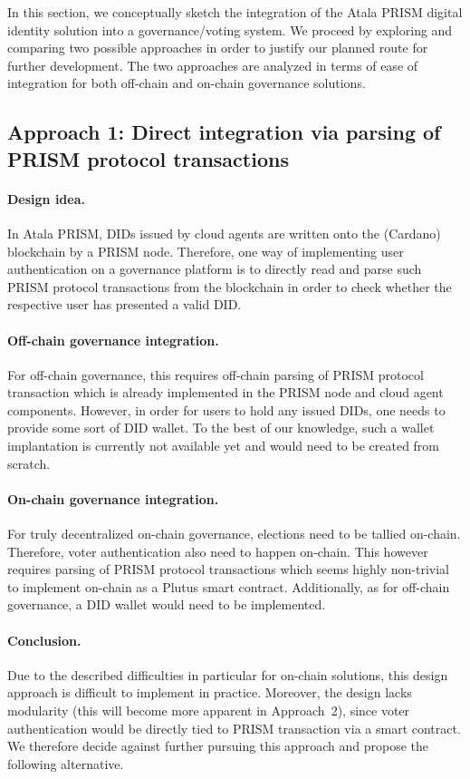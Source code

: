 \documentclass[11pt]{article}
\begin{document}
In this section, we conceptually sketch the integration of the Atala PRISM digital identity solution into a governance/voting system. We proceed by exploring and comparing two possible approaches in order to justify our planned route for further development. The two approaches are analyzed in terms of ease of integration for both off-chain and on-chain governance solutions.

\subsection{Approach 1: Direct integration via parsing of PRISM protocol transactions}

\paragraph{Design idea.} In Atala PRISM, DIDs issued by cloud agents are written onto the (Cardano) blockchain by a PRISM node. Therefore, one way of implementing user authentication on a governance platform is to directly read and parse such PRISM protocol transactions from the blockchain in order to check whether the respective user has presented a valid DID.

\paragraph{Off-chain governance integration.} For off-chain governance, this requires off-chain parsing of PRISM protocol transaction which is already implemented in the PRISM node and cloud agent components. However, in order for users to hold any issued DIDs, one needs to provide some sort of DID wallet. To the best of our knowledge, such a wallet implantation is currently not available yet and would need to be created from scratch.

\paragraph{On-chain governance integration.} For truly decentralized on-chain governance, elections need to be tallied on-chain. Therefore, voter authentication also need to happen on-chain. This however requires parsing of PRISM protocol transactions which seems highly non-trivial to implement on-chain as a Plutus smart contract. Additionally, as for off-chain governance, a DID wallet would need to be implemented.

\paragraph{Conclusion.} Due to the described difficulties in particular for on-chain solutions, this design approach is difficult to implement in practice. Moreover, the design lacks modularity (this will become more apparent in Approach~2), since voter authentication would be directly tied to PRISM transaction via a smart contract. We therefore decide against further pursuing this approach and propose the following alternative.
\end{document}
